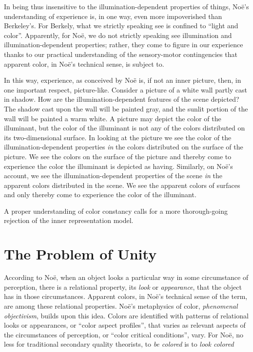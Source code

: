 \documentclass[12pt]{article}
\begin{document}
In being thus insensitive to the illumination-dependent properties of things, Noë's understanding of experience is, in one way, even more impoverished than Berkeley's. For Berkely, what we strictly speaking see is confined to ``light and color''. Apparently, for Noë, we do not strictly speaking see illumination and illumination-dependent properties; rather, they come to figure in our experience thanks to our practical understanding of the sensory-motor contingencies that apparent color, in Noë's technical sense, is subject to. 

In this way, experience, as conceived by Noë is, if not an inner picture, then, in one important respect, picture-like. Consider a picture of a white wall partly cast in shadow. How are the illumination-dependent features of the scene depicted? The shadow cast upon the wall will be painted gray, and the sunlit portion of the wall will be painted a warm white. A picture may depict the color of the illuminant, but the color of the illuminant is not any of the colors distributed on its two-dimensional surface. In looking at the picture we see the color of the illumination-dependent properties \emph{in} the colors distributed on the surface of the picture. We see the colors on the surface of the picture and thereby come to experience the color the illuminant is depicted as having. Similarly, on Noë's account, we see the illumination-dependent properties of the scene \emph{in} the apparent colors distributed in the scene. We see the apparent colors of surfaces and only thereby come to experience the color of the illuminant. 

A proper understanding of color constancy calls for a more thorough-going rejection of the inner representation model.


\section{The Problem of Unity} %
\label{sec:the_problem_of_unity}

According to Noë, when an object looks a particular way in some circumstance of perception, there is a relational property, its \emph{look} or \emph{appearance}, that the object has in those circumstances. Apparent colors, in Noë's technical sense of the term, are among these relational properties. Noë's metaphysics of color, \emph{phenomenal objectivism}, builds upon this idea. Colors are identified with patterns of relational looks or appearances, or ``color aspect profiles'', that varies as relevant aspects of the circumstances of perception, or ``color critical conditions'', vary. For Noë, no less for traditional secondary quality theorists, to \emph{be colored} is to \emph{look colored} \citep[for more on the connection between phenomenal objectivism and secondary qualities see][]{Allen:2008kx} 
\end{document}
